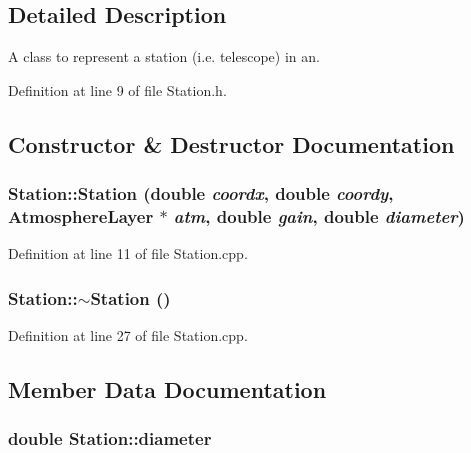 \subsection{Detailed Description}
A class to represent a station (i.e. telescope) in an. 

Definition at line 9 of file Station.h.



\subsection{Constructor \& Destructor Documentation}
\hypertarget{classStation_ac9951896c7d68a95787c50e1d5ac94d6}{
\subsubsection[{Station}]{\setlength{\rightskip}{0pt plus 5cm}Station::Station (double {\em coordx}, \/  double {\em coordy}, \/  {\bf AtmosphereLayer} $\ast$ {\em atm}, \/  double {\em gain}, \/  double {\em diameter})}}
\label{classStation_ac9951896c7d68a95787c50e1d5ac94d6}


Definition at line 11 of file Station.cpp.

\hypertarget{classStation_a00434e79e8ee7f4ebd6d3b631dde5ac0}{
\subsubsection[{$\sim$Station}]{\setlength{\rightskip}{0pt plus 5cm}Station::$\sim$Station ()}}
\label{classStation_a00434e79e8ee7f4ebd6d3b631dde5ac0}


Definition at line 27 of file Station.cpp.



\subsection{Member Data Documentation}
\hypertarget{classStation_aa7b65ca1b24be6b9b071097d5581054c}{
\subsubsection[{diameter}]{\setlength{\rightskip}{0pt plus 5cm}double {\bf Station::diameter}}}
\label{classStation_aa7b65ca1b24be6b9b071097d5581054c}


